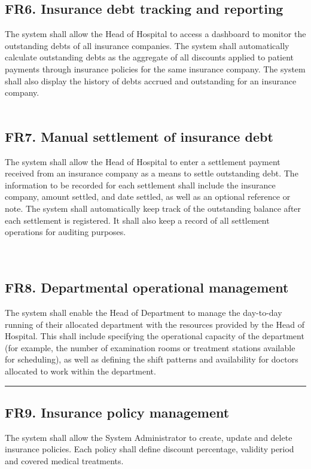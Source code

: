 \documentclass[12pt, a4paper]{article}
\begin{document}
\subsection{FR6. Insurance debt tracking and reporting} \label{FR6}
The system shall allow the Head of Hospital to access a dashboard to monitor the outstanding debts of all insurance companies. The system shall automatically calculate outstanding debts as the aggregate of all discounts applied to patient payments through insurance policies for the same insurance company. The system shall also display the history of debts accrued and outstanding for an insurance company.
\\ 
\\ 

\subsection{FR7. Manual settlement of insurance debt} \label{FR7}
The system shall allow the Head of Hospital to enter a settlement payment received from an insurance company as a means to settle outstanding debt. The information to be recorded for each settlement shall include the insurance company, amount settled, and date settled, as well as an optional reference or note. The system shall automatically keep track of the outstanding balance after each settlement is registered. It shall also keep a record of all settlement operations for auditing purposes.
\\ 
\\ 
\\ 

\subsection{FR8. Departmental operational management} \label{FR8}
The system shall enable the Head of Department to manage the day-to-day running of their allocated department with the resources provided by the Head of Hospital. This shall include specifying the operational capacity of the department (for example, the number of examination rooms or treatment stations available for scheduling), as well as defining the shift patterns and availability for doctors allocated to work within the department.

    

\noindent\rule{\textwidth}{0.4pt}
\medskip
\subsection{FR9. Insurance policy management} \label{FR9}
The system shall allow the System Administrator to create, update and delete insurance policies. Each policy shall define discount percentage, validity period and covered medical treatments.
\\ 
\end{document}
